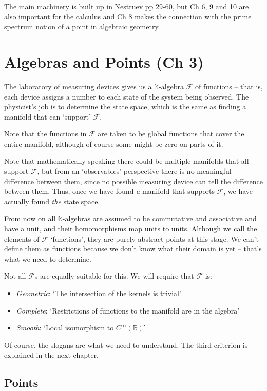 \documentclass[oneside,english]{amsbook}
\numberwithin{section}{chapter}
\theoremstyle{plain}
\theoremstyle{definition}
\begin{document}
The main machinery is built up in Nestruev pp 29-60, but Ch 6, 9 and 10 are also important for the calculus and Ch 8 makes the connection with the prime spectrum notion of a point in algebraic geometry.

\section{Algebras and Points (Ch 3)}

The laboratory of measuring devices gives us a $\mathbb{K}$-algebra $\mathscr{F}$ of functions -- that is, each device assigns a number to each state of the system being observed. The physicist's job is to determine the state space, which is the same as finding a manifold that can `support' $\mathscr{F}$.

Note that the functions in $\mathscr{F}$ are taken to be global functions that cover the entire manifold, although of course some might be zero on parts of it.

Note that mathematically speaking there could be multiple manifolds that all support $\mathscr{F}$, but from an `observables' perspective there is no meaningful difference between them, since no possible measuring device can tell the difference between them. Thus, once we have found \emph{a} manifold that supports  $\mathscr{F}$, we have actually found \emph{the} state space.

From now on all $\mathbb{K}$-algebras are assumed to be commutative and associative and have a unit, and their homomorphisms map units to units. Although we call the elements of $\mathscr{F}$ `functions', they are purely abstract points at this stage. We can't define them as functions because we don't know what their domain is yet -- that's what we need to determine.

Not all $\mathscr{F}$s are equally suitable for this. We will require that $\mathscr{F}$ is:
\begin{itemize}
	\item{\emph{Geometric}: `The intersection of the kernels is trivial'}
	\item{\emph{Complete}: `Restrictions of functions to the manifold are in the algebra'}
	\item{\emph{Smooth}: `Local isomorphism to $C^\infty(\mathbb{R})$'}
\end{itemize}
Of course, the slogans are what we need to understand. The third criterion is explained in the next chapter.

\subsection{Points}
\end{document}
